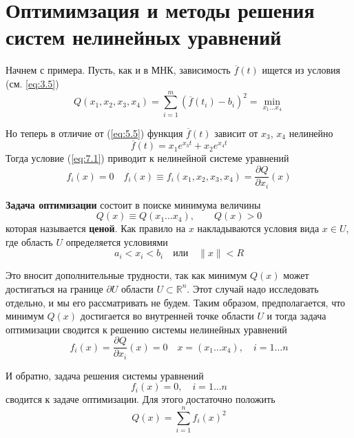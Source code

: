\section{Оптимимзация и методы решения систем нелинейных уравнений}

Начнем с примера. Пусть, как и в МНК, зависимость $\overline{f}(t)$ ищется из условия (см. \ref{eq:3.5})
\begin{equation} \label{eq:7.1}
	Q(x_1, x_2, x_3, x_4) = \sum^m_{i=1}{(\overline{f}(t_i)-b_i)^2} = \min_{x_1 \dots x_4}
\end{equation}

Но теперь в отличие от (\ref{eq:5.5}) функция $\overline{f}(t)$ зависит от $x_3$, $x_4$ нелинейно
\begin{equation} \label{eq:7.2}
	\overline{f}(t) = x_1e^{x_3 t} + x_2e^{x_4 t}
\end{equation}
Тогда условие (\ref{eq:7.1}) приводит к нелинейной системе уравнений
\begin{equation} \label{eq:7.3}
	f_i(x) = 0 \quad
	f_i(x) \equiv f_i(x_1, x_2, x_3, x_4) = \frac{\partial Q}{\partial x_i}(x)
\end{equation}

\textbf{Задача оптимизации} состоит в поиске минимума величины 
\begin{equation} \label{eq:7.4}
	Q(x) \equiv Q(x_1 \dots x_4), \qquad
	Q(x) > 0
\end{equation}
которая называется \textbf{ценой}. Как правило на $x$ накладываются условия вида $x \in U$, где область $U$ определяется условиями
\begin{equation} \label{eq:7.5}
	a_i < x_i < b_i \quad \textrm{или} \quad \|x\| < R
\end{equation}

Это вносит дополнительные трудности, так как минимум $Q(x)$ может достигаться на границе $\partial U$  области $U \subset \mathbb{R}^n$. Этот случай надо исследовать отдельно, и мы его рассматривать не будем. Таким образом, предполагается, что минимум $Q(x)$ достигается во внутренней точке области $U$ и тогда задача оптимизации сводится к решению системы нелинейных уравнений
\begin{equation} \label{eq:7.6}
	f_i(x) = \frac{\partial Q}{\partial x_i}(x) = 0 \quad x = (x_1 \dots x_4), \quad i = 1 \dots n
\end{equation}

И обратно, задача решения системы уравнений
\begin{equation} \label{eq:7.7}
	f_i(x) = 0, \quad i = 1 \dots n
\end{equation}
сводится к задаче оптимизации. Для этого достаточно положить
\begin{equation} \label{eq:7.8}
	Q(x) = \sum^n_{i=1}{f_i(x)^2}
\end{equation}

